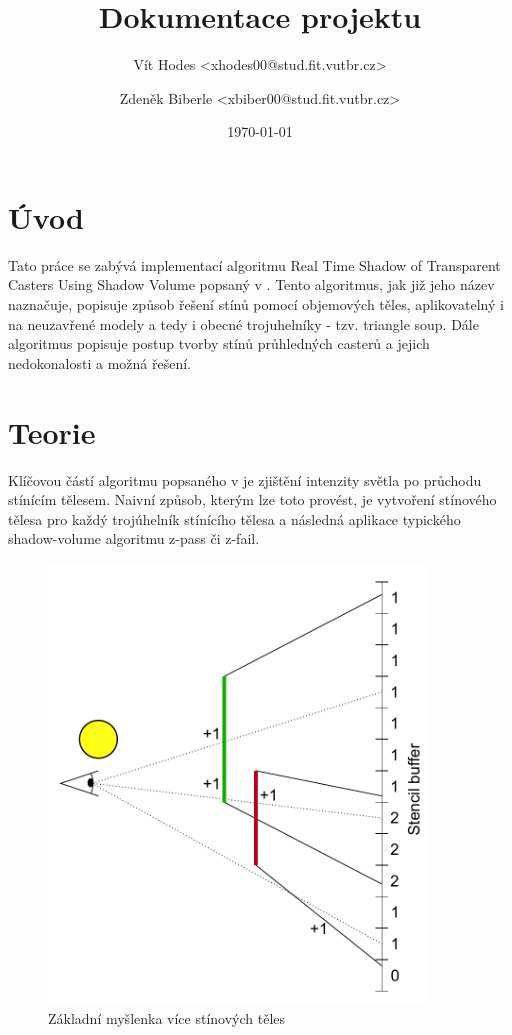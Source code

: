 \documentclass[a4paper, 12pt]{article}
\title{Dokumentace projektu}
\author{Vít Hodes <xhodes00@stud.fit.vutbr.cz>}
\author{Zdeněk Biberle <xbiber00@stud.fit.vutbr.cz>}
\date{\today}
\begin{document}
\maketitle

\section{Úvod}


Tato práce se zabývá implementací algoritmu Real Time Shadow of Transparent Casters Using Shadow
Volume popsaný v \cite{Byungmoon2007}. Tento algoritmus, jak již jeho název naznačuje, popisuje způsob řešení stínů pomocí objemových těles, aplikovatelný i
na neuzavřené modely a tedy i obecné trojuhelníky - tzv. triangle soup. Dále algoritmus popisuje
postup tvorby stínů průhledných casterů a jejich nedokonalosti a možná řešení.


\section{Teorie}

Klíčovou částí algoritmu popsaného v \cite{Byungmoon2007} je zjištění intenzity světla po průchodu stínícím tělesem. Naivní způsob, kterým lze toto provést, je vytvoření stínového tělesa pro každý trojúhelník stínícího tělesa a následná aplikace typického shadow-volume algoritmu z-pass či z-fail.

\begin{figure}[H]
	\centering
	\includegraphics[width=10cm,keepaspectratio]{basic-shadow-volumes}
	\caption{Základní myšlenka více stínových těles}
	\label{fig:basic-shadow-volumes}
\end{figure}
\end{document}
